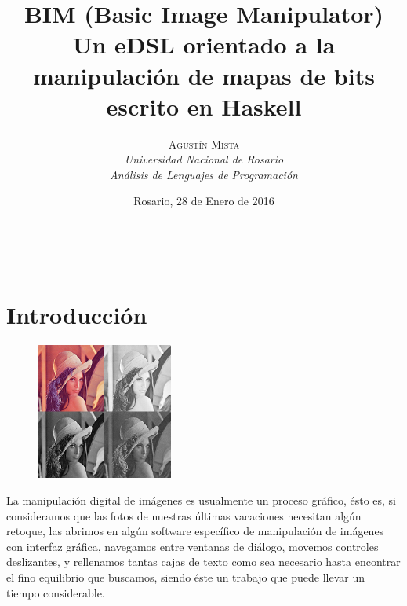\documentclass[a4paper, 11pt]{article} %
\title{
	\textbf{BIM (Basic Image Manipulator)}\\
	Un eDSL orientado a la manipulación de mapas de bits escrito en Haskell
}
\author{
	\textsc{Agustín Mista}\\
	\textit{Universidad Nacional de Rosario}\\
 	\textit{Análisis de Lenguajes de Programación}
}
\date{Rosario, 28 de Enero de 2016}
\makeatletter
\renewcommand{\maketitle}{ %
\begin{flushright} %
{\LARGE\@title} %

\vspace{50pt} %

{\large\@author} %
\\\@date %

\vspace{40pt} %
\end{flushright}
}
\makeatother
\begin{document}
\maketitle %




\vspace{20pt} %


\section*{Introducción}

\begin{figure}
	\begin{center}
		\vspace{-20pt}
		\includegraphics[width=0.4\textwidth]{lena-sample.png}
		\vspace{-20pt}
	\end{center}
\end{figure}

La manipulación digital de imágenes es usualmente un proceso gráfico, ésto es, si consideramos que las fotos de nuestras últimas vacaciones necesitan algún retoque, las abrimos en algún software específico de manipulación de imágenes con interfaz gráfica, navegamos entre ventanas de diálogo, movemos controles deslizantes, y rellenamos tantas cajas de texto como sea necesario hasta encontrar el fino equilibrio que buscamos, siendo éste un trabajo que puede llevar un tiempo considerable.
\end{document}

